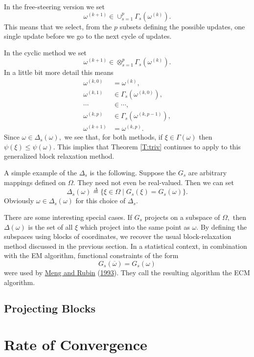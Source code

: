 \documentclass[
  12pt,
]{book}
\begin{document}
In the
free-steering version we set
\[
\omega^{(k+1)}\in\cup_{s=1}^p\Gamma_s(\omega^{(k)}).
\]
This means that we select, from the \(p\) subsets defining the
possible updates, one single update before we go to the
next cycle of updates.

In the cyclic method we set
\[
\omega^{(k+1)}\in\otimes_{s=1}^p\Gamma_s(\omega^{(k)}).
\]
In a little bit more detail this means
\begin{align*}
\omega^{(k,0)}&=\omega^{(k)},\\
\omega^{(k,1)}&\in\Gamma_s(\omega^{(k,0)}),\\
\cdots&\in\cdots,\\
\omega^{(k,p)}&\in\Gamma_s(\omega^{(k,p-1)}),\\
\omega^{(k+1)}&=\omega^{(k,p)}.
\end{align*}
Since \(\omega\in\Delta_s(\omega),\) we see that, for both methods, if \(\xi\in\Gamma(\omega)\)
then \(\psi(\xi)\leq\psi(\omega).\) This implies that
Theorem \ref{T:triv} continues to apply to this
generalized block relaxation method.

A simple example of the \(\Delta_s\) is the following. Suppose
the \(G_s\) are arbitrary mappings defined on \(\Omega.\) They
need not even be real-valued. Then we can set
\[
\Delta_s(\omega)\mathop{=}\limits^{\Delta}\{\xi\in\Omega\mid
G_s(\xi)=G_s(\omega)\}.
\]
Obviously \(\omega\in\Delta_s(\omega)\) for this choice of \(\Delta_s.\)

There are some interesting special cases. If \(G_s\) projects on a subspace of \(\Omega,\)
then \(\Delta(\omega)\)
is the set of all \(\xi\) which project into the
same point as \(\omega.\) By defining the subspaces using blocks
of coordinates, we recover the usual block-relaxation method discussed
in the previous section. In a statistical context, in combination
with the EM algorithm, functional constraints of the form
\[
G_s(\overline\omega)=G_s(\omega)
\]
were used by
\protect\hyperlink{ref-meng_rubin_93}{Meng and Rubin} (\protect\hyperlink{ref-meng_rubin_93}{1993}). They call the resulting algorithm the ECM algorithm.

\hypertarget{blockrelaxation:blockorder:projectingblocks}{%
\subsection{Projecting Blocks}\label{blockrelaxation:blockorder:projectingblocks}}

\hypertarget{blockrelaxation:rateofconvergence}{%
\section{Rate of Convergence}\label{blockrelaxation:rateofconvergence}}
\end{document}

